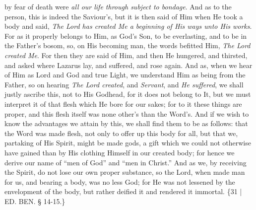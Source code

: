 by fear of death were \emph{all our life through subject to bondage}.
And as to the person, this is indeed the Saviour's, but it is then
said of Him when He took a body and said, \emph{The Lord has created Me a
beginning of His ways unto His works}. For as it properly belongs
to Him, as God's Son, to be everlasting, and to be in the Father's
bosom, so, on His becoming man, the words befitted Him, \emph{The Lord
created Me}. For then they are said of Him, and then He hungered,
and thirsted, and asked where Lazarus lay, and suffered, and rose
again. And as, when we hear of Him as Lord and God and true Light, we
understand Him as being from the Father, so on hearing \emph{The Lord
created}, and \emph{Servant}, and \emph{He suffered}, we shall
justly ascribe this, not to His Godhead, for it does not belong to It,
but we must interpret it of that flesh which He bore for our sakes;
for to it these things are proper, and this flesh itself was none
other's than the Word's. And if we wish to know the advantages we
attain by this, we shall find them to be as follows: that the Word was
made flesh, not only to offer up this body for all, but that we,
partaking of His Spirit, might be made gods, a gift which we could not
otherwise have gained than by His clothing Himself in our created
body; for hence we derive our name of ``men of God'' and ``men in Christ.''
And as we, by receiving the Spirit, do not lose our own proper
substance, so the Lord, when made man for us, and bearing a body, was
no less God; for He was not lessened by the envelopment of the body,
but rather deified it and rendered it immortal. \{31 | ED.
BEN.
§ 14-15.\}


